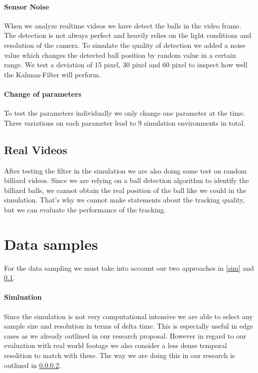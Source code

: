 \documentclass[titlepage, a4paper, 11pt]{scrartcl}
\begin{document}
\paragraph{Sensor Noise}

When we analyze realtime videos we have detect the balls in the video frame.
The detection is not always perfect and heavily relies on the light conditions and resolution of the camera.
To simulate the quality of detection we added a noise value which changes the detected ball position by random value in a certain range.
We test a deviation of 15 pixel, 30 pixel and 60 pixel to inspect how well the Kalman-Filter will perform.

\paragraph{Change of parameters} \label{cng}

To test the parameters individually we only change one parameter at the time.
Three variations on each parameter lead to 9 simulation environments in total.

\subsection{Real Videos} \label{vid}

After testing the filter in the simulation we are also doing some test on random billiard videos.
Since we are relying on a ball detection algorithm to identify the billiard balls, we cannot obtain the real position of the ball like we could in the simulation.
That's why we cannot make statements about the tracking quality, but we can evaluate the performance of the tracking.

\section{Data samples}

For the data sampling we must take into account our two approaches in \ref{sim} and \ref{vid}.

\paragraph{Simluation}

Since the simulation is not very computational intensive we are able to select any sample size and resolution in terms of delta time.
This is especially useful in edge cases as we already outlined in our research proposal.
However in regard to our evaluation with real world footage we also consider a less dense temporal resolition to match with these.
The way we are doing this in our research is outlined in \ref{cng}.
\end{document}
